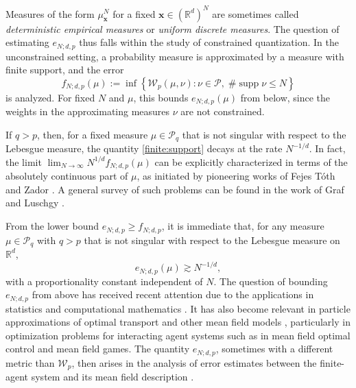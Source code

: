 \documentclass[11pt,reqno]{amsart}
\newcommand{\bx}{{\bm{x}}}
\theoremstyle{definition}
\def\bx{{\boldsymbol x}}
\newcommand{\bm}[1]{\boldsymbol #1}
\newcommand{\Rd}{{\mathbb{R}^d}}
\DeclareMathOperator{\supp}{supp}
\newcommand{\mcl}{\mathcal}
\theoremstyle{definition}
\numberwithin{equation}{section}
\numberwithin{lemma}{section}
\numberwithin{proposition}{section}
\numberwithin{theorem}{section}
\numberwithin{corollary}{section}
\numberwithin{definition}{section}
\numberwithin{remark}{section}
\begin{document}
Measures of the form $\mu^N_\bx$ for a fixed $\bx \in (\Rd)^N$ are sometimes called \textit{deterministic empirical measures} or \textit{uniform discrete measures}. The question of estimating $e_{N;d,p}$ thus falls within the study of constrained quantization. In the unconstrained setting, a probability measure is approximated by a measure with finite support, and the error
\begin{equation}\label{finite:support}
	f_{N;d,p}(\mu) := \inf \left\{ \mcl W_p(\mu, \nu) : \nu \in \mcl P, \;  \# \supp \nu \le N \right\}
\end{equation}
is analyzed. For fixed $N$ and $\mu$, this bounds $e_{N;d,p}(\mu)$ from below, since the weights in the approximating measures $\nu$ are not constrained. 

If $q > p$, then, for a fixed measure $\mu \in \mcl P_q$ that is not singular with respect to the Lebesgue measure, the quantity \eqref{finite:support} decays at the rate $N^{-1/d}$. In fact, the limit $\lim_{N \to \infty} N^{1/d} f_{N;d,p}(\mu)$ can be explicitly characterized in terms of the absolutely continuous part of $\mu$, as initiated by pioneering works of Fejes T\'oth \cite{FT} and Zador \cite{Z}. A general survey of such problems can be found in the work of Graf and Luschgy \cite{GL}.

From the lower bound $e_{N;d,p} \ge f_{N;d,p}$, it is immediate that, for any measure $\mu \in \mcl P_q$ with $q > p$ that is not singular with respect to the Lebesgue measure on $\Rd$,
\begin{equation}\label{optimal:lower:bound}
	e_{N;d,p}(\mu) \gtrsim  N^{-1/d},
\end{equation}
with a proportionality constant independent of $N$. The question of bounding $e_{N;d,p}$ from above has received recent attention due to the applications in statistics and computational mathematics \cite{BHM, DBB, DKS, MJ, GHMR1, GHMR2}. It has also become relevant in particle approximations of optimal transport and other mean field models \cite{BJ2, EN, KX, Smfg}, particularly in optimization problems for interacting agent systems such as in mean field optimal control and mean field games. The quantity $e_{N;d,p}$, sometimes with a different metric than $\mcl W_p$, then arises in the analysis of error estimates between the finite-agent system and its mean field description \cite{BCC, BEZ, CDLL, CJMS, CDJM, CDJS, DDJ}.
\end{document}
